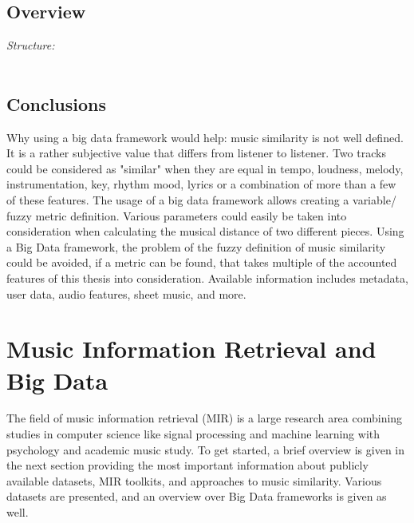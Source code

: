 \section{Overview}

\textit{Structure: \\}
\ \\
\begin{figure}[htbp]
	\centering
\end{figure}

\section{Conclusions}

Why using a big data framework would help: 
music similarity is not well defined. It is a rather subjective value that differs from listener to listener. 
Two tracks could be considered as "similar" when they are equal in tempo, loudness, melody, instrumentation, key, rhythm mood, lyrics or a combination of more than a few of these features. The usage of a big data framework allows creating a variable/ fuzzy metric definition. Various parameters could easily be taken into consideration when calculating the musical distance of two different pieces. 
Using a Big Data framework, the problem of the fuzzy definition of music similarity could be avoided, if a metric can be found, that takes multiple of the accounted features of this thesis into consideration.
Available information includes metadata, user data, audio features, sheet music, and more.

\chapter{Music Information Retrieval and Big Data}\label{audiofeat}

The field of music information retrieval (MIR) is a large research area combining studies in computer science like signal processing and machine learning with psychology and academic music study. To get started, a brief overview is given in the next section providing the most important information about publicly available datasets, MIR toolkits, and approaches to music similarity. Various datasets are presented, and an overview over Big Data frameworks is given as well.

